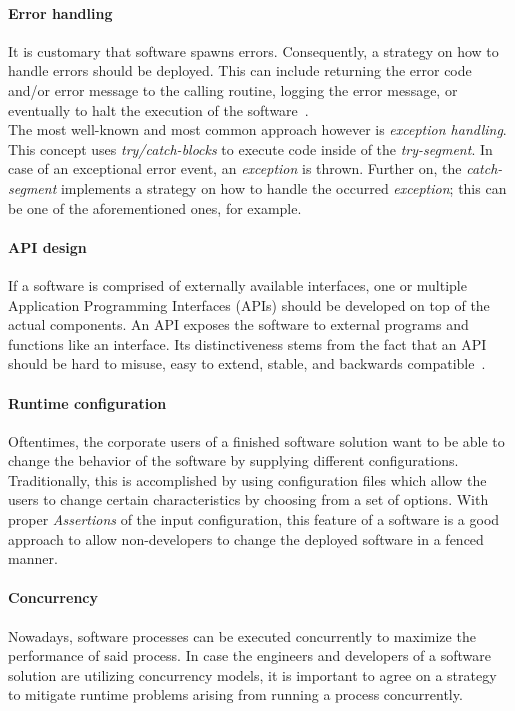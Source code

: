 \documentclass[12pt,a4paper,twoside]{report}
\begin{document}
\paragraph{Error handling}
It is customary that software spawns errors. Consequently, a strategy on how
to handle errors should be deployed. This can include returning the error code
and/or error message to the calling routine, logging the error message, or
eventually to halt the execution of the software~\cite{swebok}.\\
The most well-known and most common approach however is \textit{exception handling}.
This concept uses \textit{try/catch-blocks} to execute code inside of
the \textit{try-segment}. In case of an exceptional error event,
an \textit{exception} is thrown. Further on, the \textit{catch-segment}
implements a strategy on how to handle the occurred \textit{exception};
this can be one of the aforementioned ones, for example.

\paragraph{API design}
If a software is comprised of externally available interfaces,
one or multiple Application Programming Interfaces (APIs) should be developed
on top of the actual components. An API exposes the software to external programs
and functions like an interface. Its distinctiveness stems from the fact that
an API should be hard to misuse, easy to extend, stable, and backwards compatible~\cite{swebok}.

\paragraph{Runtime configuration}
Oftentimes, the corporate users of a finished software solution want to be able
to change the behavior of the software by supplying different configurations.
Traditionally, this is accomplished by using configuration files which allow
the users to change certain characteristics by choosing from a set of options.
With proper \textit{Assertions} of the input configuration, this feature of a
software is a good approach to allow non-developers to change the deployed software
in a fenced manner.

\paragraph{Concurrency}
Nowadays, software processes can be executed concurrently to maximize the performance
of said process. In case the engineers and developers of a software solution
are utilizing concurrency models, it is important to agree on a strategy to
mitigate runtime problems arising from running a process concurrently.
\end{document}
